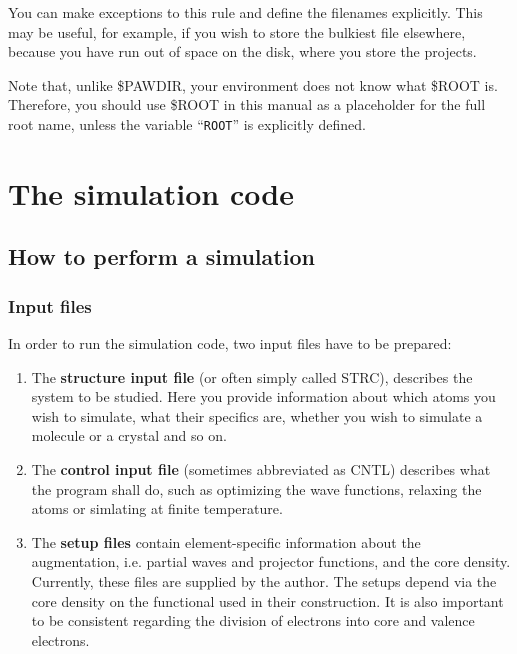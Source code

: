 \documentclass[final,12pt]{article}
\begin{document}
You can make exceptions to this rule and define the filenames
explicitly. This may be useful, for example, if you wish to store the
bulkiest file elsewhere, because you have run out of space on the
disk, where you store the projects.

Note that, unlike \$PAWDIR, your environment does not know what \$ROOT
is. Therefore, you should use \$ROOT in this manual as a placeholder for
the full root name, unless the variable ``{\tt ROOT}'' is
explicitly defined. 

\section{The simulation code}

\subsection{How to perform a simulation}

\subsubsection{Input files}

In order to run the simulation code, two input files have to be
prepared:

\begin{enumerate}
\item The {\bf structure input file} (or often simply called STRC),
  describes the system to be studied. Here you provide information
  about which atoms you wish to simulate, what their specifics
  are, whether you wish to simulate a molecule or a crystal and so on.
\item The {\bf control input file} (sometimes abbreviated as CNTL)
  describes what the program shall do, such as optimizing the wave
  functions, relaxing the atoms or simlating at finite temperature.
\item The {\bf setup files} contain element-specific information about
  the augmentation, i.e. partial waves and projector functions, and
  the core density.  Currently, these files are supplied by the
  author.  The setups depend via the core density on the functional
  used in their construction. It is also important to be consistent
  regarding the 
  division of electrons into  core and valence electrons.
\end{enumerate}
\end{document}
